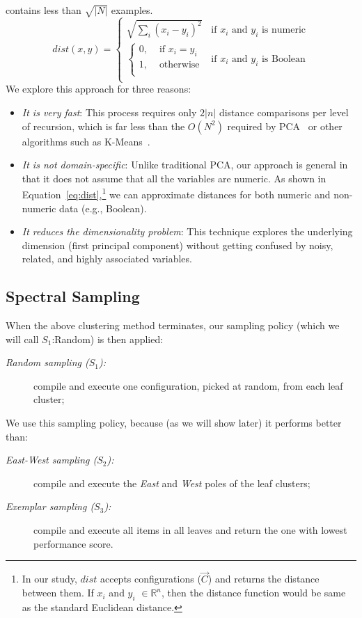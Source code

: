 \documentclass{newsig}
\begin{document}
contains less than  $\sqrt{|N|}$ examples.
\begin{equation}
    \mathit{dist}(x, y) = 
    \begin{cases}
        \sqrt{\sum_i(x_i-y_i)^2}& \text{if $x_i$ and $y_i$ is numeric}\\
        \begin{cases}
            0, & \text{ if $x_i = y_i$}\\
            1, & \text{ otherwise}\\
        \end{cases}
        & \text{if $x_i$ and $y_i$ is Boolean}\\
    \end{cases}
    \label{eq:dist}
\end{equation}
We explore this approach for three reasons:
\begin{itemize}
\item
{\em It is very fast}:
This process requires only $2|n|$ distance comparisons
per level of recursion, which is far less than the $O(N^2)$
required by PCA~\cite{Du2008}
or other  algorithms such as K-Means~\cite{hamerly2010making}.
\item
{\em It is not domain-specific}:
Unlike traditional PCA, our approach is general in that it does not assume that all the variables are numeric. As shown in Equation~\ref{eq:dist},\footnote{In our study, $\mathit{dist}$ accepts configurations ($\vec{C}$) and returns the distance between them. If $x_i$ and $y_i$ $\in \mathbb{R}^n$, then the distance function would be same as the standard Euclidean distance.} we can approximate distances for both numeric and non-numeric data (e.g., Boolean).

\item
{\em It reduces the dimensionality problem}:
This technique explores the underlying dimension (first principal component) without getting confused by noisy, related, and highly associated variables.
\end{itemize}

\subsection{Spectral Sampling}\label{sect:sample}
When the above clustering method terminates, our  sampling policy (which we will call $S_1$:Random) is then applied:
\begin{description}
\item[{\em Random sampling ($S_1$):}] compile and execute one  configuration,  picked at random, from each leaf cluster;
\end{description}
We use this sampling policy, because (as we will show later) it performs better than:
\begin{description}
\item[{\em East-West sampling ($S_2$):}] compile and execute the {\em East} and {\em West} poles of the leaf clusters;
\item[{\em Exemplar sampling ($S_3$):}] compile and execute all items in all leaves and return the one
with lowest performance score.
\end{description}
\end{document}
